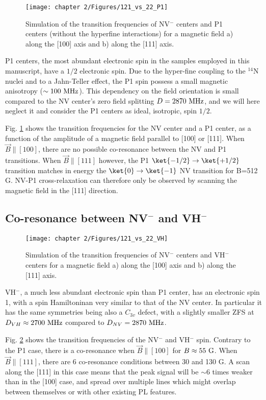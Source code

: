 \documentclass[a4paper, 11pt]{report}
\begin{document}
\begin{figure}[h]
\centering
\texttt{[image: chapter 2/Figures/121\_vs\_22\_P1]}
\caption{Simulation of the transition frequencies of NV$^-$ centers and P1 centers (without the hyperfine interactions) for a magnetic field a) along the [100] axis and b) along the [111] axis.}
\label{121 vs 22 P1}
\end{figure}

P1 centers, the most abundant electronic spin in the samples employed in this manuscript, have a $1/2$ electronic spin. Due to the hyper-fine coupling to the $^{14}$N nuclei and to a Jahn-Teller effect, the P1 spin possess a small magnetic anisotropy ($\sim 100\ \rm MHz$). This dependency on the field orientation is small compared to the NV center's zero field splitting $D=2870\ \rm MHz$, and we will here neglect it and consider the P1 centers as ideal, isotropic, spin $1/2$.

Fig. \ref{121 vs 22 P1} shows the transition frequencies for the NV center and a P1 center, as a function of the amplitude of a magnetic field parallel to [100] or [111]. When $\vec{B} \parallel [100]$, there are no possible co-resonance between the NV and P1 transitions. When $\vec{B} \parallel [111]$ however, the P1 $\ket{-1/2} \to \ket{+1/2}$ transition matches in energy the $\ket{0}\to\ket{-1}$ NV transition for B=512 G. NV-P1 cross-relaxation can therefore only be observed by scanning the magnetic field in the [111] direction.

\subsection{Co-resonance between NV$^-$ and VH$^-$}

\begin{figure}[h]
\centering
\texttt{[image: chapter 2/Figures/121\_vs\_22\_VH]}
\caption{Simulation of the transition frequencies of NV$^-$ centers and VH$^-$ centers for a magnetic field a) along the [100] axis and b) along the [111] axis.}
\label{121 vs 22 VH}
\end{figure}

VH$^-$, a much less abundant electronic spin than P1 center, has an electronic spin 1, with a spin Hamiltoninan very similar to that of the NV center. In particular it has the same symmetries being also a $C_{3v}$ defect, with a slightly smaller ZFS at $D_{VH} \approx 2700\ \rm MHz$ compared to $D_{NV}=2870\ \rm MHz$. 

Fig. \ref{121 vs 22 VH} shows the transition frequencies of the NV$^-$ and VH$^-$ spin. Contrary to the P1 case, there is a co-resonance when $\vec{B} \parallel [100]$ for $B\approx 55\ \rm G$. When $\vec{B} \parallel [111]$, there are 6 co-resonance conditions between 30 and 130 G. A scan along the [111] in this case means that the peak signal will be $\sim 6$ times weaker than in the [100] case, and spread over multiple lines which might overlap between themselves or with other existing PL features.
\end{document}
